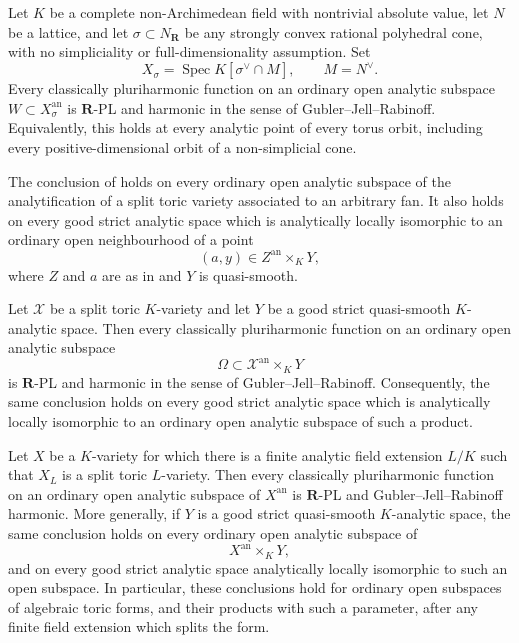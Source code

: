 \begin{theorem}
\label{thm:p061-split-toric-all-orbits}
Let \(K\) be a complete non-Archimedean field with nontrivial absolute
value, let \(N\) be a lattice, and let
\(\sigma\subset N_{\mathbf R}\) be any strongly convex rational
polyhedral cone, with no simpliciality or full-dimensionality assumption.
Set
\[
 X_\sigma=\operatorname{Spec}
 K[\sigma^\vee\cap M],
 \qquad M=N^\vee.
\]
Every classically pluriharmonic function on an ordinary open analytic
subspace \(W\subset X_\sigma^{\mathrm{an}}\) is \(\mathbf R\)-PL and
harmonic in the sense of Gubler--Jell--Rabinoff.  Equivalently, this holds
at every analytic point of every torus orbit, including every
positive-dimensional orbit of a non-simplicial cone.
\end{theorem}

\begin{corollary}
\label{cor:p061-split-toric-varieties}
The conclusion of  holds on every
ordinary open analytic subspace of the analytification of a split toric
variety associated to an arbitrary fan.  It also holds on every good
strict analytic space which is analytically locally isomorphic to an
ordinary open neighbourhood of a point
\[
 (a,y)\in Z^{\mathrm{an}}\times_KY,
\]
where \(Z\) and \(a\) are as in
 and \(Y\) is
quasi-smooth.
\end{corollary}

\begin{corollary}
\label{cor:p061-split-toric-quasismooth-products}
Let \(\mathcal X\) be a split toric \(K\)-variety and let \(Y\) be a
good strict quasi-smooth \(K\)-analytic space.  Then every classically
pluriharmonic function on an ordinary open analytic subspace
\[
 \Omega\subset \mathcal X^{\mathrm{an}}\times_KY
\]
is \(\mathbf R\)-PL and harmonic in the sense of
Gubler--Jell--Rabinoff.  Consequently, the same conclusion holds on every
good strict analytic space which is analytically locally isomorphic to an
ordinary open analytic subspace of such a product.
\end{corollary}

\begin{corollary}
\label{cor:p061-toric-forms}
Let \(X\) be a \(K\)-variety for which there is a finite analytic field
extension \(L/K\) such that \(X_L\) is a split toric \(L\)-variety.  Then
every classically pluriharmonic function on an ordinary open analytic
subspace of \(X^{\mathrm{an}}\) is \(\mathbf R\)-PL and
Gubler--Jell--Rabinoff harmonic.  More generally, if \(Y\) is a good strict
quasi-smooth \(K\)-analytic space, the same conclusion holds on every
ordinary open analytic subspace of
\[
 X^{\mathrm{an}}\times_KY,
\]
and on every good strict analytic space analytically locally isomorphic to
such an open subspace.  In particular, these conclusions hold for ordinary
open subspaces of algebraic toric forms, and their products with such a
parameter, after any finite field extension which splits the form.
\end{corollary}
